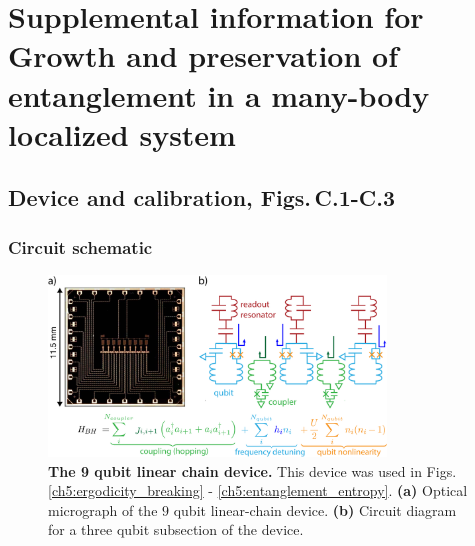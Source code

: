


\chapter[Supplemental information for Growth and preservation of entanglement in a many-body localized system]{Supplemental information for Growth and preservation of entanglement in a many-body localized system}

\section{Device and calibration, Figs.\,C.1-C.3}

\subsection{Circuit schematic}
\begin{figure}
    \centering
    \includegraphics[width=0.80\textwidth, keepaspectratio]{./PDF/fs1_190916_1029a.pdf}
    \caption{\textbf{The 9 qubit linear chain device.} This device was used in Figs.\,\ref{ch5:ergodicity_breaking} - \ref{ch5:entanglement_entropy}.
        \textbf{(a)} Optical micrograph of the $9$ qubit linear-chain device.
        \textbf{(b)} Circuit diagram for a three qubit subsection of the device.}
    \label{gmon_linear_chain}
\end{figure}

